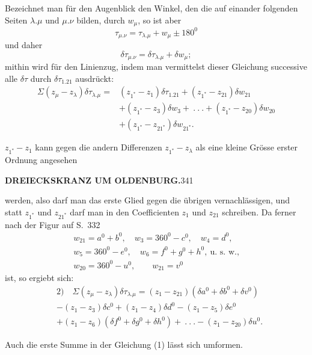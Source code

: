 \par\noindent\hspace*{\parindent}Bezeichnet man für den Augenblick den Winkel, den die auf einander folgenden Seiten \(\lambda.\mu\) und \(\mu.\nu\) bilden, durch \(w_\mu\), so ist aber
\[
\tau_{\mu.\nu}=\tau_{\lambda.\mu}+w_\mu\pm180^0
\]
\noindent und daher
\[
\delta\tau_{\mu.\nu}=\delta\tau_{\lambda.\mu}+\delta w_\mu;
\]
\noindent mithin wird für den Linienzug, indem man vermittelst dieser Gleichung successive alle \(\delta\tau\) durch \(\delta\tau_{1.21}\) ausdrückt:
\[
\begin{aligned}
\Sigma(z_\mu-z_\lambda)\delta\tau_{\lambda.\mu}={}&(z_{1^*}-z_1)\delta\tau_{1.21}+(z_{1^*}-z_{21})\delta w_{21}\\
&+(z_{1^*}-z_3)\delta w_3+\ .\ .\ .+(z_{1^*}-z_{20})\delta w_{20}\\
&+(z_{1^*}-z_{21^*})\delta w_{21^*}.
\end{aligned}
\]
\par\noindent\hspace*{\parindent}\(z_{1^*}-z_1\) kann gegen die andern Differenzen \(z_{1^*}-z_\lambda\) als eine kleine Grösse erster Ordnung angesehen
\par\clearpage
\noindent\textbf{DREIECKSKRANZ UM OLDENBURG.}\hfill341\par\medskip
\noindent werden, also darf man das erste Glied gegen die übrigen vernachlässigen, und statt \(z_{1^*}\) und \(z_{21^*}\) darf man in den Coefficienten \(z_1\) und \(z_{21}\) schreiben. Da ferner nach der Figur auf S.~332
\[
\begin{gathered}
w_{21}=a^0+b^0,\quad w_3=360^0-c^0,\quad w_4=d^0,\\
w_5=360^0-e^0,\quad w_6=f^0+g^0+h^0,\ \text{u. s. w.,}\\
w_{20}=360^0-u^0,\qquad w_{21}=v^0
\end{gathered}
\]
\noindent ist, so ergiebt sich:
\[
\begin{aligned}
&2)\quad\Sigma(z_\mu-z_\lambda)\delta\tau_{\lambda.\mu}=(z_1-z_{21})(\delta a^0+\delta b^0+\delta v^0)\\
&-(z_1-z_3)\delta c^0+(z_1-z_4)\delta d^0-(z_1-z_5)\delta e^0\\
&+(z_1-z_6)(\delta f^0+\delta g^0+\delta h^0)\!+\ .\ .\ .-(z_1-z_{20})\delta u^0.
\end{aligned}
\]
\par\noindent\hspace*{\parindent}Auch die erste Summe in der Gleichung (1) lässt sich umformen.

